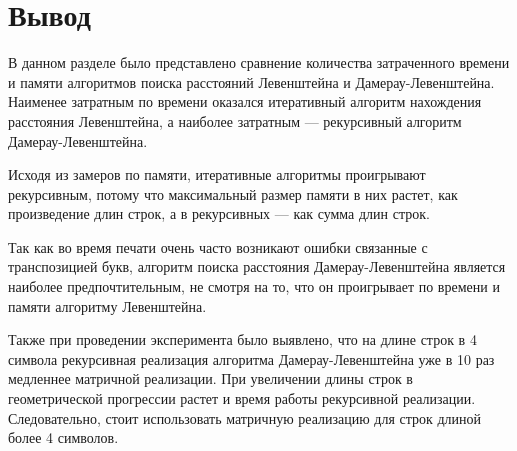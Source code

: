 \section{Вывод}

В данном разделе было представлено сравнение количества затраченного времени и памяти алгоритмов поиска расстояний Левенштейна и Дамерау-Левенштейна. Наименее затратным по времени оказался итеративный алгоритм нахождения расстояния Левенштейна, а наиболее затратным --- рекурсивный алгоритм Дамерау-Левенштейна.

Исходя из замеров по памяти, итеративные алгоритмы проигрывают рекурсивным, потому что максимальный размер памяти в них растет, как произведение длин строк, а в рекурсивных --- как сумма длин строк.

Так как во время печати очень часто возникают ошибки связанные с транспозицией букв, алгоритм поиска расстояния Дамерау-Левенштейна является наиболее предпочтительным, не смотря на то, что он проигрывает по времени и памяти алгоритму Левенштейна.

Также при проведении эксперимента было выявлено, что на длине строк в 4 символа рекурсивная реализация алгоритма Дамерау-Левенштейна уже в 10 раз медленнее матричной реализации. При увеличении длины строк в геометрической прогрессии растет и время работы рекурсивной реализации. Следовательно, стоит использовать матричную реализацию для строк длиной более 4 символов.

